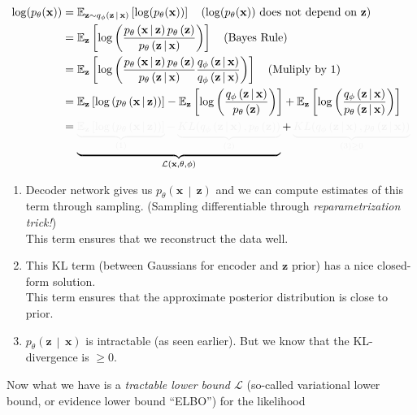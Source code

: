 \documentclass[a2paper,8pt]{extarticle}
\makeatletter
\newcommand{\tcb}[1]{\textcolor{lighttext}{#1}}
\newcommand{\tcb}[1]{\textcolor{blue}{#1}}
\def\mc#1#{\@mc{#1}}
\def\@mc#1#2#3{%
  \protect\leavevmode
  \begingroup
    \color#1{#2}#3%
  \endgroup
}
\newcommand{\mcr}[1]{\mc{lighttext}{#1}}
\newcommand{\mcg}[1]{\mc{lighttext}{#1}}
\newcommand{\mcr}[1]{\mc{red}{#1}}
\newcommand{\mcg}[1]{\mc{green}{#1}}
\newcommand{\cL}{\mathcal{L}}
\newcommand{\Dist}[2]{#1\left( #2 \right)}
\newcommand{\cDist}[3]{#1\left( #2 \,\middle|\, #3 \right)}
\newcommand{\Exp}[2][]{{\mathbb{E}_{#1}}\left[ #2
\right]}
\renewcommand{\vec}[1]{\mathbf{#1}}
\newcommand{\vx}{\vec{x}}
\newcommand{\vz}{\vec{z}}
\makeatother
\begin{document}
\begin{landscape}
\begin{multicols*}{7}
\begin{gather*}
\begin{align*}
\log(p_\theta(\vx))
&=\Exp[\vz\sim \cDist{q_\phi}{\vz}{\vx}]{\log(p_\theta(\vx))}
\quad (\log(p_\theta(\vx))\text{ does not depend on $\vz$})
\\
&=
\Exp[\vz]{
\log\left(
\frac{
\cDist{p_\theta}{\vx}{\vz}\Dist{p_\theta}{\vz}
}{
\cDist{p_\theta}{\vz}{\vx}
}
\right)
}
\quad(\text{Bayes Rule})
\\
&=
\Exp[\vz]{
\log\left(
\frac{
\cDist{p_\theta}{\vx}{\vz}\Dist{p_\theta}{\vz}
}{
\cDist{p_\theta}{\vz}{\vx}
}
\frac{\cDist{q_\phi}{\vz}{\vx}}{\cDist{q_\phi}{\vz}{\vx}}
\right)
}
\quad(\text{Muliply by 1})
\\
&=
\Exp[\vz]{\log\left(\cDist{p_\theta}{\vx}{\vz}\right)}
-
\Exp[\vz]{\log\left(
\frac{
\cDist{q_\phi}{\vz}{\vx}
}{
\Dist{p_\theta}{\vz}
}
\right)}
+
\Exp[\vz]{\log\left(
\frac{
\cDist{q_\phi}{\vz}{\vx}
}{
\cDist{p_\theta}{\vz}{\vx}
}
\right)}
\\
&=
\underbrace{
\mcg{\underbrace{\Exp[\vz]{\log\left(\cDist{p_\theta}{\vx}{\vz}\right)}}_{(1)}
-
\underbrace{KL(\cDist{q_\phi}{\vz}{\vx},\Dist{p_\theta}{\vz})}_{(2)}}
}_{\cL(\vx,\theta,\phi)}
+
\mcr{
\underbrace{KL(\cDist{q_\phi}{\vz}{\vx},\cDist{p_\theta}{\vz}{\vx})}_{(3)\geq 0}
}
\end{align*}
\end{gather*}

\begin{enumerate}[label=(\arabic*)]
  \item Decoder network gives us $\cDist{p_\theta}{\vx}{\vz}$ and we can compute
  estimates of this term through sampling. (Sampling differentiable through
  \emph{reparametrization trick!})\\
  This term ensures that we reconstruct the data well.
  \item This KL term (between Gaussians for encoder and $\vz$ prior) has a nice
  closed-form solution.\\

  This term ensures that the approximate posterior distribution is close to
  prior.
  \item $\cDist{p_\theta}{\vz}{\vx}$ is intractable (as seen earlier). But we
  know that the KL-divergence is $\geq 0$.
\end{enumerate}

Now what we have is a \emph{tractable lower bound $\cL$} (so-called
\tcb{variational lower bound, or evidence lower bound ``ELBO''}) for the
likelihood


\end{multicols*}
\end{landscape}
\end{document}
